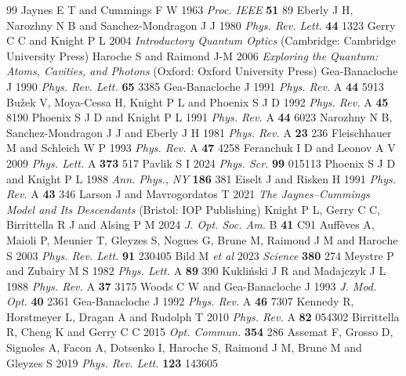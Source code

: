 \documentclass{iopjournal}
\begin{document}
\begin{thebibliography}{99}
 Jaynes E T and Cummings F W 1963 {\it Proc. IEEE} {\bf 51} 89
 Eberly J H, Narozhny N B and Sanchez-Mondragon J J 1980 {\it Phys. Rev. Lett.} {\bf 44} 1323
 Gerry C C and Knight P L 2004 {\it Introductory Quantum Optics} (Cambridge: Cambridge University Press)
 Haroche S and Raimond J-M 2006 {\it Exploring the Quantum: Atoms, Cavities, and Photons} (Oxford: Oxford University Press)
 Gea-Banacloche J 1990 {\it Phys. Rev. Lett.} {\bf 65} 3385
 Gea-Banacloche J 1991 {\it Phys. Rev.} A {\bf 44} 5913
 Bu\v{z}ek V, Moya-Cessa H, Knight P L and Phoenix S J D 1992 {\it Phys. Rev.} A {\bf 45} 8190
 Phoenix S J D and Knight P L 1991 {\it Phys. Rev.} A {\bf 44} 6023
 Narozhny N B, Sanchez-Mondragon J J and Eberly J H 1981 {\it Phys. Rev.} A {\bf 23} 236
 Fleischhauer M and Schleich W P 1993 {\it Phys. Rev.} A {\bf 47} 4258
 Feranchuk I D and Leonov A V 2009 {\it Phys. Lett.} A {\bf 373} 517
 Pavlik S I 2024 {\it Phys. Scr.} {\bf 99} 015113
 Phoenix S J D and Knight P L 1988 {\it Ann. Phys., NY} {\bf 186} 381
 Eiselt J and Risken H 1991 {\it Phys. Rev.} A {\bf 43} 346
 Larson J and Mavrogordatos T 2021 {\it The Jaynes--Cummings Model and Its Descendants} (Bristol: IOP Publishing)
 Knight P L, Gerry C C, Birrittella R J and Alsing P M 2024 {\it J. Opt. Soc. Am.} B {\bf 41} C91
 Auff\`{e}ves A, Maioli P, Meunier T, Gleyzes S, Nogues G, Brune M, Raimond J M and Haroche S 2003 {\it Phys. Rev. Lett.} {\bf 91} 230405
 Bild M {\it et al} 2023 {\it Science} {\bf 380} 274
 Meystre P and Zubairy M S 1982 {\it Phys. Lett.} A {\bf 89} 390
 Kukli\'{n}ski J R and Madajczyk J L 1988 {\it Phys. Rev.} A {\bf 37} 3175
 Woods C W and Gea-Banacloche J 1993 {\it J. Mod. Opt.} {\bf 40} 2361
 Gea-Banacloche J 1992 {\it Phys. Rev.} A {\bf 46} 7307
 Kennedy R, Horstmeyer L, Dragan A and Rudolph T 2010 {\it Phys. Rev.} A {\bf 82} 054302
 Birrittella R, Cheng K and Gerry C C 2015 {\it Opt. Commun.} {\bf 354} 286
 Assemat F, Grosso D, Signoles A, Facon A, Dotsenko I, Haroche S, Raimond J M, Brune M and Gleyzes S 2019 {\it Phys. Rev. Lett.} {\bf 123} 143605

\end{thebibliography}
\end{document}
